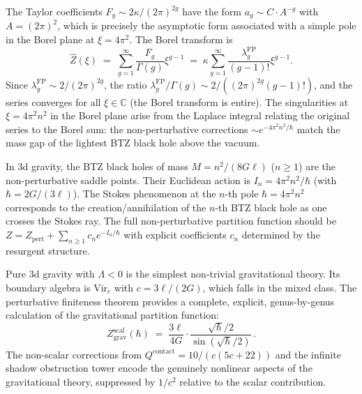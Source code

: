 \begin{evidence}
\label{evid:thqg-I-resurgent}
The Taylor coefficients $F_g \sim 2\kappa/(2\pi)^{2g}$ have the form $a_g \sim C \cdot A^{-g}$ with $A = (2\pi)^2$, which is precisely the asymptotic form associated with a simple pole in the Borel plane at $\xi = 4\pi^2$. The Borel transform is
\begin{equation}\label{eq:thqg-I-borel-transform}
\hat{Z}(\xi) \;=\; \sum_{g=1}^\infty \frac{F_g}{\Gamma(g)} \xi^{g-1} \;=\; \kappa \sum_{g=1}^\infty \frac{\lambda_g^{\mathrm{FP}}}{(g-1)!} \xi^{g-1}.
\end{equation}
Since $\lambda_g^{\mathrm{FP}} \sim 2/(2\pi)^{2g}$, the ratio $\lambda_g^{\mathrm{FP}}/\Gamma(g) \sim 2/((2\pi)^{2g}(g-1)!)$, and the series converges for all $\xi \in \mathbb{C}$ (the Borel transform is entire). The singularities at $\xi = 4\pi^2 n^2$ in the Borel plane arise from the Laplace integral relating the original series to the Borel sum: the non-perturbative corrections $\sim e^{-4\pi^2 n^2/\hbar}$ match the mass gap of the lightest BTZ black hole above the vacuum.
\end{evidence}

\begin{remark}
\label{rem:thqg-I-btz-saddles}
In 3d gravity, the BTZ black holes of mass $M = n^2/(8G\ell)$ ($n \geq 1$) are the non-perturbative saddle points. Their Euclidean action is $I_n = 4\pi^2 n^2 / \hbar$ (with $\hbar = 2G/(3\ell)$). The Stokes phenomenon at the $n$-th pole $\hbar = 4\pi^2 n^2$ corresponds to the creation/annihilation of the $n$-th BTZ black hole as one crosses the Stokes ray. The full non-perturbative partition function should be $Z = Z_{\mathrm{pert}} + \sum_{n \geq 1} c_n e^{-I_n/\hbar}$ with explicit coefficients $c_n$ determined by the resurgent structure.
\end{remark}

\begin{remark}
\label{rem:thqg-I-pure-3d}
Pure 3d gravity with $\Lambda < 0$ is the simplest non-trivial gravitational theory. Its boundary algebra is $\mathrm{Vir}_c$ with $c = 3\ell/(2G)$, which falls in the mixed class. The perturbative finiteness theorem provides a complete, explicit, genus-by-genus calculation of the gravitational partition function:
\[
Z_{\mathrm{grav}}^{\mathrm{scal}}(\hbar) \;=\; \frac{3\ell}{4G} \cdot \frac{\sqrt{\hbar}/2}{\sin(\sqrt{\hbar}/2)}\,.
\]
The non-scalar corrections from $Q^{\mathrm{contact}} = 10/(c(5c+22))$ and the infinite shadow obstruction tower encode the genuinely nonlinear aspects of the gravitational theory, suppressed by $1/c^2$ relative to the scalar contribution.
\end{remark}

